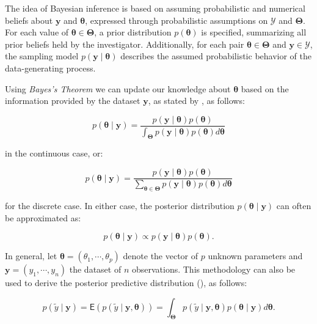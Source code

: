 \vspace{0.8cm}

The idea of Bayesian inference is based on assuming probabilistic and numerical beliefs about $\bm{y}$ and $\bm{\theta}$, expressed through probabilistic assumptions on $\bm{\mathcal{Y}}$ and $\bm{\Theta}$. For each value of $\bm{\theta}\in\bm{\Theta}$, a prior distribution $p(\bm{\theta})$ is specified, summarizing all prior beliefs held by the investigator. Additionally, for each pair $\bm{\theta}\in\bm{\Theta}$ and $\bm{y}\in\bm{\mathcal{Y}}$, the sampling model $p(\bm{y}\mid\bm{\theta})$ describes the assumed probabilistic behavior of the data-generating process.

\vspace{0.5cm}

Using \textit{Bayes's Theorem} we can update our knowledge about $\bm{\theta}$ based on the information provided by the dataset $\bm{y}$, as stated by \cite{GELMAN14}, as follows:

\begin{equation}
p(\bm{\theta}\mid\bm{y})=\frac{p(\bm{y}\mid\bm{\theta})p(\bm{\theta})}{\int_{\bm{\Theta}}p(\bm{y}\mid\bm{\theta})p(\bm{\theta})d\bm{\theta}}  
\end{equation}


in the continuous case, or: 

\begin{equation}
p(\bm{\theta}\mid \bm{y})=\frac{p(\bm{y}\mid\bm{\theta})p(\bm{\theta})}{\sum_{\bm{\theta}\in\bm{\Theta}}p(\bm{y}\mid\bm{\theta})p(\bm{\theta})d\bm{\theta}}
\end{equation}

for the discrete case. In either case, the posterior distribution $p(\bm{\theta}\mid\bm{y})$ can often be approximated as:

\begin{equation} 
\label{bayes1}
p(\bm{\theta}\mid\bm{y})\propto p(\bm{y}\mid\bm{\theta})p(\bm{\theta}).    
\end{equation}

\vspace{0.5cm}

In general, let $\bm{\theta}=(\theta_1,\cdots,\theta_p)$ denote the vector of $p$ unknown parameters and $\bm{y}=(y_1,\cdots,y_n)$ the dataset of $n$ observations. This methodology can also be used to derive the posterior predictive distribution (\cite{HOFF}), as follows:

\begin{equation} 
\label{bayes_pred}
p(\tilde{y}\mid\bm{y})=\mathsf{E}\left(p(\tilde{y}\mid\bm{y},\bm{\theta})\right)=\int_{\bm{\Theta}} p(\tilde{y}\mid\bm{y},\bm{\theta})p(\bm{\theta}\mid\bm{y}) d\bm{\theta}.  
\end{equation}


